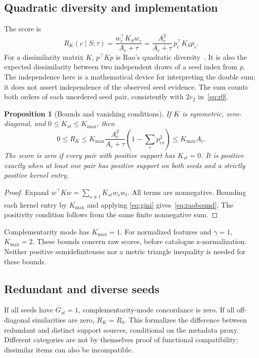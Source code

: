 \documentclass[11pt,a4paper]{article}
\newtheorem{proposition}[theorem]{Proposition}
\theoremstyle{remark}
\begin{document}
\subsection{Quadratic diversity and implementation}
The score is
\begin{equation}
 R_K(c\mid S;\tau)=\frac{w_c^\top K_Sw_c}{A_c+\tau}
  =\frac{A_c^2}{A_c+\tau}\,p_c^\top K_Sp_c.
 \label{eq:rao}
\end{equation}
For a dissimilarity matrix $K$, $p^\top Kp$ is Rao's quadratic
diversity~\cite{rao1982}. It is also the expected dissimilarity between
two independent draws of a seed index from $p$. The independence here is
a mathematical device for interpreting the double sum; it does not assert
independence of the observed seed evidence. The sum counts both orders of
each unordered seed pair, consistently with $2e_2$ in~\eqref{eq:r0}.

\begin{proposition}[Bounds and vanishing conditions]
If $K$ is symmetric, zero-diagonal, and $0\leq K_{st}\leq K_{\max}$,
then
\begin{equation}
 0\leq R_K\leq K_{\max}\frac{A_c^2}{A_c+\tau}
                  \left(1-\sum_s p_{cs}^2\right)
 \leq K_{\max} A_c.
 \label{eq:raobound}
\end{equation}
The score is zero if every pair with positive support has $K_{st}=0$.
It is positive exactly when at least one pair has positive support on
both seeds and a strictly positive kernel entry.
\end{proposition}
\begin{proof}
Expand $w^\top Kw=\sum_{s\neq t}K_{st}w_sw_t$. All terms are
nonnegative. Bounding each kernel entry by $K_{\max}$ and applying
\eqref{eq:gini} gives~\eqref{eq:raobound}. The positivity condition follows
from the same finite nonnegative sum.
\end{proof}
Complementarity mode has $K_{\max}=1$. For normalized features and
$\gamma=1$, $K_{\max}=2$. These bounds concern raw scores, before
catalogue z-normalization. Neither positive semidefiniteness nor a metric
triangle inequality is needed for these bounds.

\subsection{Redundant and diverse seeds}
If all seeds have $G_{st}=1$, complementarity-mode concordance is zero.
If all off-diagonal similarities are zero, $R_K=R_0$. This formalizes
the difference between redundant and distinct support sources, conditional
on the metadata proxy. Different categories are not by themselves proof
of functional compatibility; dissimilar items can also be incompatible.
\end{document}
